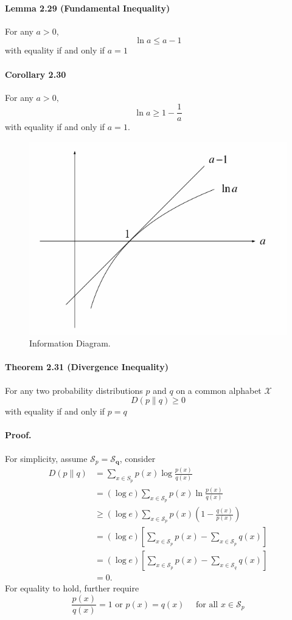 \documentclass[8pt]{article}
\begin{document}
\begin{tcolorbox}
\paragraph{Lemma 2.29 (Fundamental Inequality)} For any $a>0$,
$$
\ln a \leq a-1
$$
with equality if and only if $a=1$\\

\paragraph{Corollary 2.30} For any $a>0,$
$$
\ln a \geq 1-\frac{1}{a}
$$
with equality if and only if $a=1$.

\end{tcolorbox}
\begin{figure}[!h]
    \centering
    \includegraphics[width=0.5\linewidth]{imgs/def2_29.png}
    \caption{Information Diagram.}
    \label{fig:my_label}
\end{figure}

\begin{tcolorbox}
\paragraph{Theorem 2.31 (Divergence Inequality)} For any two probability distributions $p$ and $q$ on a common alphabet $\mathcal{X}$
$$
D(p \| q) \geq 0
$$
with equality if and only if $p=q$
\end{tcolorbox}
\paragraph{Proof.} For simplicity, assume $\mathcal{S}_{p}=\mathcal{S}_{\boldsymbol{q}}$, consider
$$
\begin{aligned}
D(p \| q) &=\sum_{x \in S_{p}} p(x) \log \frac{p(x)}{q(x)} \\
&=(\log c) \sum_{x \in \mathcal{S}_{p}} p(x) \ln \frac{p(x)}{q(x)} \\
& \geq(\log e) \sum_{x \in \mathcal{S}_{p}} p(x)\left(1-\frac{q(x)}{p(x)}\right) \\
&=(\log c)\left[\sum_{x \in \mathcal{S}_{p}} p(x)-\sum_{x \in \mathcal{S}_{p}} q(x)\right] \\
&=(\log e)\left[\sum_{x \in \mathcal{S}_{p}} p(x)-\sum_{x \in \mathcal{S}_{q}} q(x)\right] \\
&=0 .
\end{aligned}
$$
For equality to hold, further require
$$
\frac{p(x)}{q(x)}=1 \text { or } p(x)=q(x) \quad \text { for all } x \in \mathcal{S}_{p}
$$
\end{document}

